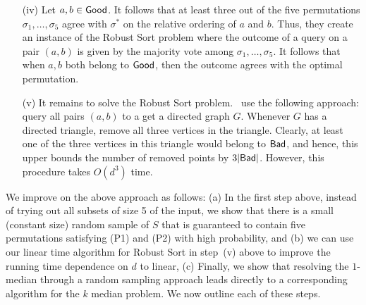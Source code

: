 \documentclass[11pt]{llncs}
\newcommand{\robust}{{\textsf{Robust Sort}}\xspace}
\begin{document}
\begin{itemize}
\item[(iv)] Let $a, b \in {\mathsf{Good}}$. It follows that at least three out of the five permutations $\sigma_1, \ldots, \sigma_5$ agree with $\sigma^*$ on the relative ordering of $a$ and $b$. Thus, they create an instance of the \robust problem where the outcome of a query on a pair $(a,b)$ is given by the majority vote among $\sigma_1, \ldots, \sigma_5$. It follows that when $a, b$ both belong to ${\mathsf{Good}}$, then the outcome agrees with the optimal permutation. 
\item[(v)] It remains to solve the \robust problem.~\cite{cdk23} use the following approach: query all pairs $(a,b)$ to a get a directed graph $G$. Whenever $G$ has a directed triangle, remove all three vertices in the triangle. Clearly, at least one of the three vertices in this triangle would belong to ${\mathsf{Bad}}$, and hence, this upper bounds the number of removed points by $3 |{\mathsf{Bad}}|$. However, this procedure takes $O(d^3)$ time. 
\end{itemize}

We improve on the above approach as follows: (a) In the first step above, instead of trying out all subsets of size 5 of the input, we show that there is a small (constant size) random sample of $S$ that is guaranteed to contain five permutations satisfying (P1) and (P2) with high probability, and (b) we can use our linear time algorithm for \robust in step~(v) above to improve the running time dependence on $d$ to linear, (c) Finally, we show that resolving the $1$-median through a random sampling approach leads directly to a corresponding algorithm for the $k$ median problem. We now outline each of these steps. 
\end{document}
